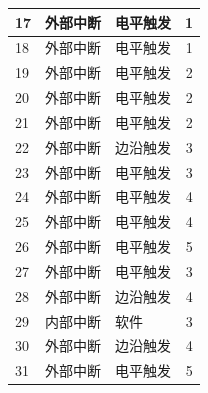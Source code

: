 \begin{longtable}[c]{ |l|l|l|c| }
    \hline
    17  & 外部中断    & 电平触发   & 1                 \\
    \hline
    18  & 外部中断    & 电平触发   & 1                 \\
    \hline
    19  & 外部中断    & 电平触发   & 2                 \\
    \hline
    20  & 外部中断    & 电平触发   & 2                 \\
    \hline
    21  & 外部中断    & 电平触发   & 2                 \\
    \hline
    22  & 外部中断    & 边沿触发    & 3                 \\
    \hline
    23  & 外部中断    & 电平触发   & 3                 \\
    \hline
    24  & 外部中断    & 电平触发   & 4                 \\
    \hline
    25  & 外部中断    & 电平触发   & 4                 \\
    \hline
    26  & 外部中断    & 电平触发   & 5                 \\
    \hline
    27  & 外部中断    & 电平触发   & 3                 \\
    \hline
    28  & 外部中断    & 边沿触发    & 4                 \\
    \hline
    29  & 内部中断    & 软件          & 3                 \\
    \hline
    30  & 外部中断    & 边沿触发    & 4                 \\
    \hline
    31  & 外部中断    & 电平触发   & 5                 \\
    
\end{longtable}
